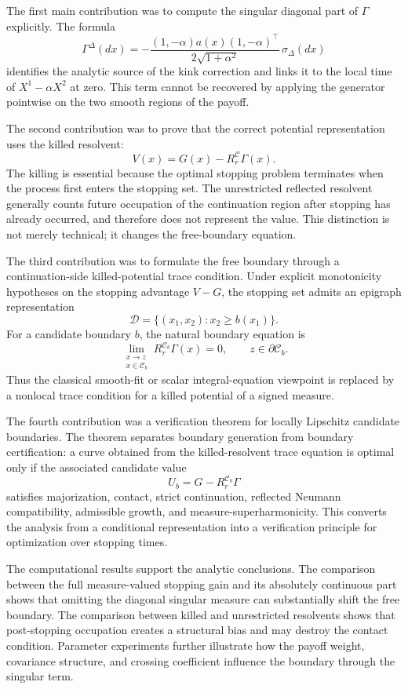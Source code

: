 \documentclass[pdflatex,sn-mathphys-num]{sn-jnl}
\theoremstyle{plain}
\theoremstyle{definition}
\theoremstyle{remark}
\numberwithin{equation}{section}
\begin{document}
The first main contribution was to compute the singular diagonal part of
\(\Gamma\) explicitly. The formula
\[
        \Gamma^\Delta(dx)
        =
        -
        \frac{(1,-\alpha)a(x)(1,-\alpha)^\top}
        {2\sqrt{1+\alpha^2}}\,
        \sigma_\Delta(dx)
\]
identifies the analytic source of the kink correction and links it to the local
time of \(X^1-\alpha X^2\) at zero. This term cannot be recovered by applying
the generator pointwise on the two smooth regions of the payoff.

The second contribution was to prove that the correct potential representation
uses the killed resolvent:
\[
        V(x)=G(x)-R_r^{\mathcal C}\Gamma(x).
\]
The killing is essential because the optimal stopping problem terminates when
the process first enters the stopping set. The unrestricted reflected resolvent
generally counts future occupation of the continuation region after stopping
has already occurred, and therefore does not represent the value. This
distinction is not merely technical; it changes the free-boundary equation.

The third contribution was to formulate the free boundary through a
continuation-side killed-potential trace condition. Under explicit monotonicity
hypotheses on the stopping advantage \(V-G\), the stopping set admits an
epigraph representation
\[
        \mathcal D=\{(x_1,x_2):x_2\ge b(x_1)\}.
\]
For a candidate boundary \(b\), the natural boundary equation is
\[
        \lim_{\substack{x\to z\\x\in\mathcal C_b}}
        R_r^{\mathcal C_b}\Gamma(x)=0,
        \qquad z\in\partial\mathcal C_b .
\]
Thus the classical smooth-fit or scalar integral-equation viewpoint is
replaced by a nonlocal trace condition for a killed potential of a signed
measure.

The fourth contribution was a verification theorem for locally Lipschitz
candidate boundaries. The theorem separates boundary generation from boundary
certification: a curve obtained from the killed-resolvent trace equation is
optimal only if the associated candidate value
\[
        U_b=G-R_r^{\mathcal C_b}\Gamma
\]
satisfies majorization, contact, strict continuation, reflected Neumann
compatibility, admissible growth, and measure-superharmonicity. This converts
the analysis from a conditional representation into a verification principle
for optimization over stopping times.

The computational results support the analytic conclusions. The comparison
between the full measure-valued stopping gain and its absolutely continuous
part shows that omitting the diagonal singular measure can substantially shift
the free boundary. The comparison between killed and unrestricted resolvents
shows that post-stopping occupation creates a structural bias and may destroy
the contact condition. Parameter experiments further illustrate how the payoff
weight, covariance structure, and crossing coefficient influence the boundary
through the singular term.
\end{document}
